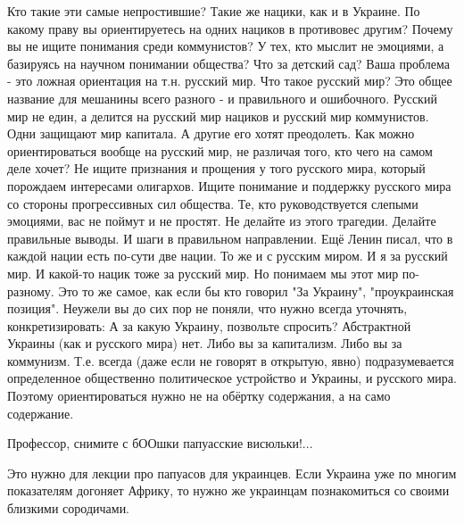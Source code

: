 \begin{itemize}
\obeycr
Кто такие эти самые непростившие?
Такие же нацики, как и в Украине.
По какому праву вы ориентируетесь на одних нациков в противовес другим?
Почему вы не ищите понимания среди коммунистов?
У тех, кто мыслит не эмоциями, а базируясь на научном понимании общества?
Что за детский сад?
Ваша проблема - это ложная ориентация на т.н. русский мир.
Что такое русский мир?
Это общее название для мешанины всего разного - и правильного и ошибочного.
Русский мир не един, а делится на русский мир нациков и русский мир коммунистов.
Одни защищают мир капитала.
А другие его хотят преодолеть.
Как можно ориентироваться вообще на русский мир, не различая того, кто чего на самом деле хочет?
Не ищите признания и прощения у того русского мира, который порождаем интересами олигархов.
Ищите понимание и поддержку русского мира со стороны прогрессивных сил общества.
Те, кто руководствуется слепыми эмоциями, вас не поймут и не простят.
Не делайте из этого трагедии.
Делайте правильные выводы.
И шаги в правильном направлении.
Ещё Ленин писал, что в каждой нации есть по-сути две нации.
То же и с русским миром.
И я за русский мир.
И какой-то нацик тоже за русский мир.
Но понимаем мы этот мир по-разному.
Это то же самое, как если бы кто говорил "За Украину", "проукраинская позиция".
Неужели вы до сих пор не поняли, что нужно всегда уточнять, конкретизировать:
А за какую Украину, позвольте спросить?
Абстрактной Украины (как и русского мира) нет.
Либо вы за капитализм.
Либо вы за коммунизм.
Т.е. всегда (даже если не говорят в открытую, явно) подразумевается определенное общественно политическое устройство и Украины, и русского мира.
Поэтому ориентироваться нужно не на обёртку содержания, а на само содержание.
\restorecr


 

Профессор, снимите с бООшки папуасские висюльки!...

\begin{itemize}
 
Это нужно для лекции про папуасов для украинцев.
Если Украина уже по многим показателям догоняет Африку, то нужно же украинцам познакомиться со своими близкими сородичами.


\end{itemize}
\end{itemize}
